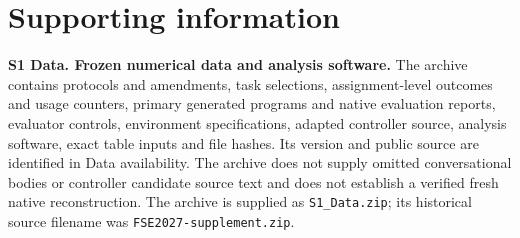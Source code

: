 \documentclass[10pt,letterpaper]{article}
\begin{document}
\section*{Supporting information}
\noindent\textbf{S1 Data. Frozen numerical data and analysis software.} The archive contains protocols and amendments, task selections, assignment-level outcomes and usage counters, primary generated programs and native evaluation reports, evaluator controls, environment specifications, adapted controller source, analysis software, exact table inputs and file hashes. Its version and public source are identified in Data availability. The archive does not supply omitted conversational bodies or controller candidate source text and does not establish a verified fresh native reconstruction. The archive is supplied as \texttt{S1\_Data.zip}; its historical source filename was \texttt{FSE2027-supplement.zip}.
\end{document}
